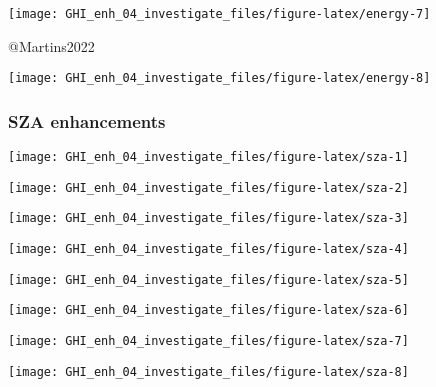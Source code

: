 \documentclass[
  10pt,
  a4paper,oneside]{article}
\begin{document}
\begin{center}\texttt{[image: GHI\_enh\_04\_investigate\_files/figure-latex/energy-7]} \end{center}

@Martins2022

\begin{center}\texttt{[image: GHI\_enh\_04\_investigate\_files/figure-latex/energy-8]} \end{center}

\newpage
\FloatBarrier

\hypertarget{sza-enhancements}{%
\subsubsection{SZA enhancements}\label{sza-enhancements}}

\begin{center}\texttt{[image: GHI\_enh\_04\_investigate\_files/figure-latex/sza-1]} \end{center}

\begin{center}\texttt{[image: GHI\_enh\_04\_investigate\_files/figure-latex/sza-2]} \end{center}

\begin{center}\texttt{[image: GHI\_enh\_04\_investigate\_files/figure-latex/sza-3]} \end{center}

\begin{center}\texttt{[image: GHI\_enh\_04\_investigate\_files/figure-latex/sza-4]} \end{center}

\begin{center}\texttt{[image: GHI\_enh\_04\_investigate\_files/figure-latex/sza-5]} \end{center}

\begin{center}\texttt{[image: GHI\_enh\_04\_investigate\_files/figure-latex/sza-6]} \end{center}

\begin{center}\texttt{[image: GHI\_enh\_04\_investigate\_files/figure-latex/sza-7]} \end{center}

\begin{center}\texttt{[image: GHI\_enh\_04\_investigate\_files/figure-latex/sza-8]} \end{center}
\end{document}
